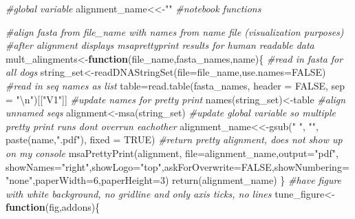 \documentclass[
]{article}
\newenvironment{Shaded}{\begin{snugshade}}{\end{snugshade}}
\newcommand{\AttributeTok}[1]{\textcolor[rgb]{0.77,0.63,0.00}{#1}}
\newcommand{\CommentTok}[1]{\textcolor[rgb]{0.56,0.35,0.01}{\textit{#1}}}
\newcommand{\ConstantTok}[1]{\textcolor[rgb]{0.00,0.00,0.00}{#1}}
\newcommand{\ControlFlowTok}[1]{\textcolor[rgb]{0.13,0.29,0.53}{\textbf{#1}}}
\newcommand{\DecValTok}[1]{\textcolor[rgb]{0.00,0.00,0.81}{#1}}
\newcommand{\FunctionTok}[1]{\textcolor[rgb]{0.00,0.00,0.00}{#1}}
\newcommand{\NormalTok}[1]{#1}
\newcommand{\OtherTok}[1]{\textcolor[rgb]{0.56,0.35,0.01}{#1}}
\newcommand{\SpecialCharTok}[1]{\textcolor[rgb]{0.00,0.00,0.00}{#1}}
\newcommand{\StringTok}[1]{\textcolor[rgb]{0.31,0.60,0.02}{#1}}
\begin{document}
\begin{Shaded}
\begin{Highlighting}[]
\CommentTok{\#global variable}
\NormalTok{alignment\_name}\OtherTok{\textless{}\textless{}{-}}\StringTok{""}
\CommentTok{\#notebook functions}

\CommentTok{\#align fasta from file\_name with names from name file (visualization purposes)}
\CommentTok{\#after alignment displays msaprettyprint results for human readable data}
\NormalTok{mult\_alingments}\OtherTok{\textless{}{-}}\ControlFlowTok{function}\NormalTok{(file\_name,fasta\_names,name)\{}
  \CommentTok{\#read in fasta for all dogs}
\NormalTok{  string\_set}\OtherTok{\textless{}{-}}\FunctionTok{readDNAStringSet}\NormalTok{(}\AttributeTok{file=}\NormalTok{file\_name,}\AttributeTok{use.names=}\ConstantTok{FALSE}\NormalTok{)}
  \CommentTok{\#read in seq names as list }
\NormalTok{  table}\OtherTok{=}\FunctionTok{read.table}\NormalTok{(fasta\_names, }\AttributeTok{header =} \ConstantTok{FALSE}\NormalTok{, }\AttributeTok{sep =} \StringTok{"}\SpecialCharTok{\textbackslash{}n}\StringTok{"}\NormalTok{)[[}\StringTok{"V1"}\NormalTok{]]}
  \CommentTok{\#update names for pretty print}
  \FunctionTok{names}\NormalTok{(string\_set)}\OtherTok{\textless{}{-}}\NormalTok{table}
  \CommentTok{\#align unnamed seqs}
\NormalTok{  alignment}\OtherTok{\textless{}{-}}\FunctionTok{msa}\NormalTok{(string\_set)}
  \CommentTok{\#update global variable so multiple pretty print runs dont overrun eachother}
\NormalTok{  alignment\_name}\OtherTok{\textless{}\textless{}{-}}\FunctionTok{gsub}\NormalTok{(}\StringTok{" "}\NormalTok{, }\StringTok{""}\NormalTok{, }\FunctionTok{paste}\NormalTok{(name,}\StringTok{".pdf"}\NormalTok{), }\AttributeTok{fixed =} \ConstantTok{TRUE}\NormalTok{)}
  \CommentTok{\#return pretty alignment, does not show up on my console}
  \FunctionTok{msaPrettyPrint}\NormalTok{(alignment, }\AttributeTok{file=}\NormalTok{alignment\_name,}\AttributeTok{output=}\StringTok{"pdf"}\NormalTok{, }\AttributeTok{showNames=}\StringTok{"right"}\NormalTok{,}\AttributeTok{showLogo=}\StringTok{"top"}\NormalTok{,}\AttributeTok{askForOverwrite=}\ConstantTok{FALSE}\NormalTok{,}\AttributeTok{showNumbering=}\StringTok{"none"}\NormalTok{,}\AttributeTok{paperWidth=}\DecValTok{6}\NormalTok{,}\AttributeTok{paperHeight=}\DecValTok{3}\NormalTok{)}
  \FunctionTok{return}\NormalTok{(alignment\_name)}
\NormalTok{\}}
\CommentTok{\#have figure with white background, no gridline and only axis ticks, no lines}
\NormalTok{tune\_figure}\OtherTok{\textless{}{-}}\ControlFlowTok{function}\NormalTok{(fig,addons)\{}

\end{Highlighting}
\end{Shaded}
\end{document}
